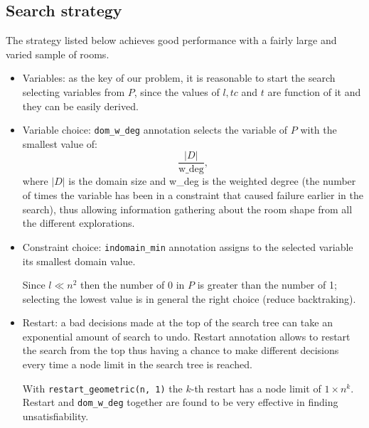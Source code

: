 \documentclass[12pt]{article}
\newcommand*{\card}[1]{\lvert #1 \rvert}
\begin{document}
\subsection{Search strategy}
The strategy listed below achieves good performance with a fairly large and
varied sample of rooms.
\begin{itemize}
  \item
  Variables:
  as the key of our problem, it is reasonable to start the search selecting
  variables from $P$,
  since the values of $l, tc$ and $t$ are function of it and they can be easily
  derived.
  \item
  Variable choice:
  \texttt{dom\_w\_deg} annotation selects the variable of $P$ with the
  smallest value of:
  \[
    \dfrac{\card{D}}{\text{w\_deg}},
  \]
  where $\card{D}$ is the domain size and w\_deg is the weighted degree (the
  number of times the variable has been in a constraint that caused failure
  earlier in the search), thus allowing information gathering about the room
  shape from all the different explorations.
  \item
  Constraint choice: \texttt{indomain\_min} annotation assigns to the selected
  variable its smallest domain value.

  Since $l \ll n^2$ then the number of 0 in $P$ is greater than the number of 1;
  selecting the lowest value is in general the right choice
  (reduce backtraking).
  \item
  Restart:
  a bad decisions made at the top of the search tree can take
  an exponential amount of search to undo. Restart annotation allows to restart
  the search from the top thus having a chance to make different decisions
  every time a node limit in the search tree is reached.

  With \texttt{restart\_geometric(n, 1)} the $k$-th restart has a node limit of
  $1 \times n^k$. Restart and \texttt{dom\_w\_deg} together are found to be
  very effective in finding unsatisfiability.
\end{itemize}
\end{document}
